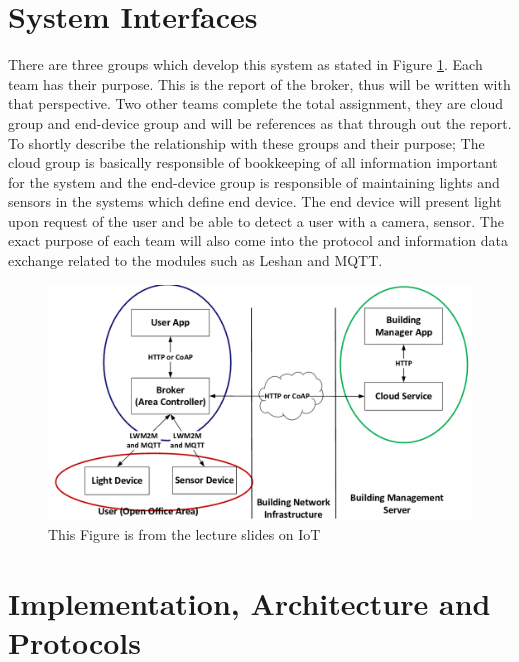 \documentclass[11pt]{article}
\begin{document}
\section{System Interfaces}
There are three groups which develop this system as stated in Figure \ref{fig:fig1}.
Each team has their purpose. This is the report of the broker, thus will be written with that perspective. Two other teams complete the total assignment, they are cloud group and end-device group and will be references as that through out the report. To shortly describe the relationship with these groups and their purpose; The cloud group is basically responsible of bookkeeping of all information important for the system and the end-device group is responsible of maintaining lights and sensors in the systems which define end device. The end device will present light upon request of the user and be able to detect a user with a camera, sensor. The exact purpose of each team will also come into the protocol and information data exchange related to the modules such as Leshan and MQTT.
\begin{figure}[h]
	\begin{center}
		\includegraphics[width=1\linewidth]{img/design}
		\caption{This Figure is from the lecture slides on IoT \cite{slides}}
		\label{fig:fig1}
	\end{center}
\end{figure}


\section{Implementation, Architecture and Protocols}
\end{document}
